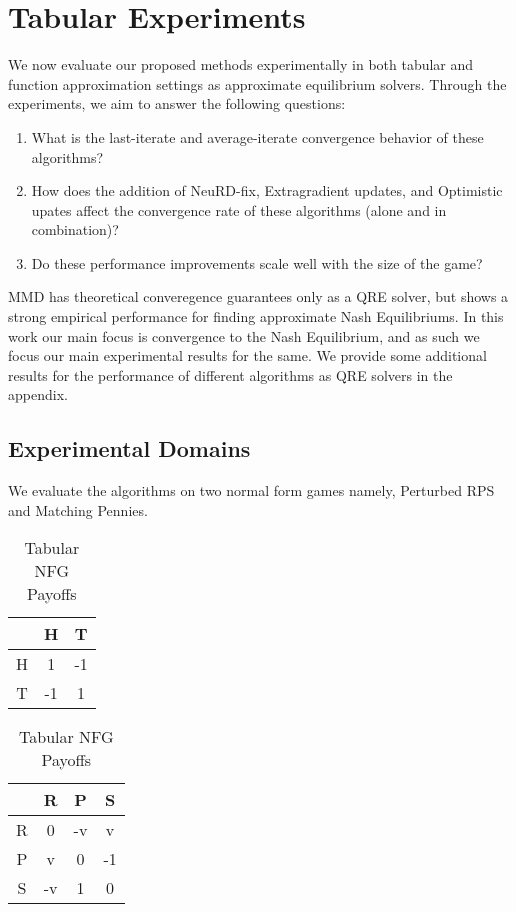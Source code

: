 \chapter{Tabular Experiments}

We now evaluate our proposed methods experimentally in both tabular and function approximation
settings as approximate equilibrium solvers.
Through the experiments, we aim to answer the following questions:
\begin{enumerate}
	\item {What is
	      the last-iterate and average-iterate convergence behavior of these algorithms?
	      }\label{qn1}
	\item {How does the addition of NeuRD-fix, Extragradient updates, and Optimistic upates
	      affect the convergence rate of these algorithms (alone and in combination)?}\label{qn2}
	\item {Do these performance improvements scale well with the size of the game?}\label{qn3}
\end{enumerate}

MMD has theoretical converegence guarantees only as a QRE solver, but shows a strong empirical
performance for finding approximate Nash Equilibriums.
In this work our main focus is convergence to the Nash Equilibrium, and as such we focus our main
experimental results for the same.
We provide some additional results for the performance of different algorithms as QRE solvers in
the appendix.

\section{Experimental Domains}
We evaluate the algorithms on two normal form games namely, Perturbed RPS and Matching Pennies.

\begin{table}
	\begin{subtable}[c]{0.5\textwidth}
	\centering
		\begin{tabular}{c|c c} 
			\text{ } & H & T \\ 
			\hline 
			H & 1 & -1\\ 
			T & -1 & 1 \\ 
		\end{tabular} 
	\end{subtable}
	\begin{subtable}[c]{0.5\textwidth}
		\centering
			\begin{tabular}{c|c c c} 
				\text{ } & R & P & S \\ 
				\hline 
				R & 0 & -v & v \\ 
				P & v & 0 & -1 \\ 
				S & -v & 1 & 0 \\
			\end{tabular} 
	\end{subtable}
	\caption{Tabular NFG Payoffs}
	\label{tab:payoffs}
\end{table}

